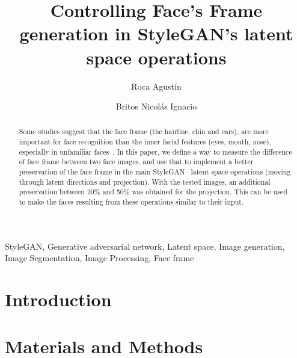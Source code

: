 \documentclass[review]{elsarticle}
\begin{document}
\begin{frontmatter}

\title{Controlling Face's Frame generation in StyleGAN's latent space operations}

\author[ITBA]{Roca Agustín}

\author[ITBA]{Britos Nicolás Ignacio}



\begin{abstract}
Some studies suggest that the face frame (the hairline, chin and ears), are more important 
for face recognition than the inner facial features (eyes, mouth, nose), especially in 
unfamiliar faces~\cite{want2003}. %
In this paper, we define a way to measure the difference of face frame
between two face images, and use that to implement a better preservation of the face frame 
in the main StyleGAN~\cite{stylegan2} latent space operations (moving through latent directions and 
projection). With the tested images, an additional preservation between 20\% and 50\% was %
obtained for the projection. This can be used to make the faces resulting from these operations
similar to their input. 
\end{abstract}

\begin{keyword}
StyleGAN, Generative adversarial network, Latent space, Image generation, Image Segmentation, Image Processing, Face frame
\end{keyword}

\end{frontmatter}

\linenumbers

\section{Introduction}


\section{Materials and Methods}
\end{document}
